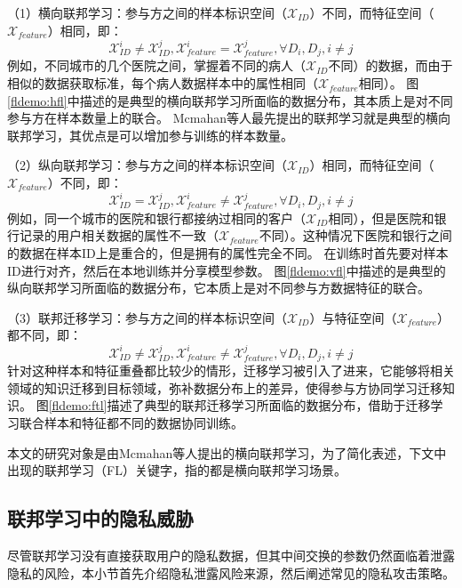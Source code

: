 （1）横向联邦学习：参与方之间的样本标识空间（$\mathcal{X}_{ID}$）不同，而特征空间（$\mathcal{X}_{feature}$）相同，即：
\begin{equation}
	\mathcal{X}_{ID}^i \neq \mathcal{X}_{ID}^j, \mathcal{X}_{feature}^i=\mathcal{X}_{feature}^j , \forall {D}_i, {D}_j, i \neq j
\end{equation}
例如，不同城市的几个医院之间，掌握着不同的病人（$\mathcal{X}_{ID}$不同）的数据，而由于相似的数据获取标准，每个病人数据样本中的属性相同（$\mathcal{X}_{feature}$相同）。
图\ref{fldemo:hfl}中描述的是典型的横向联邦学习所面临的数据分布，其本质上是对不同参与方在样本数量上的联合。
Mcmahan等人\cite{mcmahan2017communication}最先提出的联邦学习就是典型的横向联邦学习，其优点是可以增加参与训练的样本数量。

（2）纵向联邦学习：参与方之间的样本标识空间（$\mathcal{X}_{ID}$）相同，而特征空间（$\mathcal{X}_{feature}$）不同，即：
\begin{equation}
	\mathcal{X}_{ID}^i = \mathcal{X}_{ID}^j, \mathcal{X}_{feature}^i \neq \mathcal{X}_{feature}^j , \forall {D}_i, {D}_j, i \neq j
\end{equation}
例如，同一个城市的医院和银行都接纳过相同的客户（$\mathcal{X}_{ID}$相同），但是医院和银行记录的用户相关数据的属性不一致（$\mathcal{X}_{feature}$不同）。这种情况下医院和银行之间的数据在样本ID上是重合的，但是拥有的属性完全不同。
在训练时首先要对样本ID进行对齐，然后在本地训练并分享模型参数。
图\ref{fldemo:vfl}中描述的是典型的纵向联邦学习所面临的数据分布，它本质上是对不同参与方数据特征的联合。

（3）联邦迁移学习：参与方之间的样本标识空间（$\mathcal{X}_{ID}$）与特征空间（$\mathcal{X}_{feature}$）都不同，即：
\begin{equation}
	\mathcal{X}_{ID}^i \neq \mathcal{X}_{ID}^j, \mathcal{X}_{feature}^i \neq \mathcal{X}_{feature}^j , \forall {D}_i, {D}_j, i \neq j
\end{equation}
针对这种样本和特征重叠都比较少的情形，迁移学习被引入了进来，它能够将相关领域的知识迁移到目标领域，弥补数据分布上的差异，使得参与方协同学习迁移知识。
图\ref{fldemo:ftl}描述了典型的联邦迁移学习所面临的数据分布，借助于迁移学习联合样本和特征都不同的数据协同训练。

本文的研究对象是由Mcmahan等人\cite{mcmahan2017communication}提出的横向联邦学习，为了简化表述，下文中出现的联邦学习（FL）关键字，指的都是横向联邦学习场景。

\subsection{联邦学习中的隐私威胁}
尽管联邦学习没有直接获取用户的隐私数据，但其中间交换的参数仍然面临着泄露隐私的风险，本小节首先介绍隐私泄露风险来源，然后阐述常见的隐私攻击策略。

